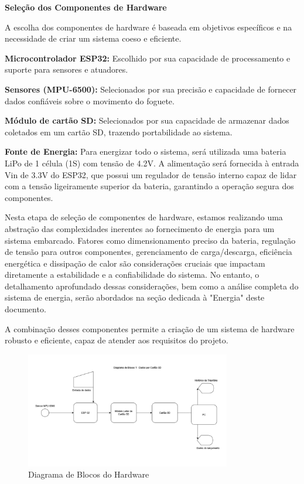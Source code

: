 \textbf{Seleção dos Componentes de Hardware}

A escolha dos componentes de hardware é baseada em objetivos específicos e na necessidade de criar um sistema coeso e eficiente.

\textbf{Microcontrolador ESP32:} Escolhido por sua capacidade de processamento e suporte para sensores e atuadores.

\textbf{Sensores (MPU-6500):} Selecionados por sua precisão e capacidade de fornecer dados confiáveis sobre o movimento do foguete.

\textbf{Módulo de cartão SD:} Selecionados por sua capacidade de armazenar dados coletados em um cartão SD, trazendo portabilidade ao sistema.

\textbf{Fonte de Energia:} Para energizar todo o sistema, será utilizada uma bateria LiPo de 1 célula (1S) com tensão de 4.2V. A alimentação será fornecida à entrada Vin de 3.3V do ESP32, que possui um regulador de tensão interno capaz de lidar com a tensão ligeiramente superior da bateria, garantindo a operação segura dos componentes.

Nesta etapa de seleção de componentes de hardware, estamos realizando uma abstração das complexidades inerentes ao fornecimento de energia para um sistema embarcado. Fatores como dimensionamento preciso da bateria, regulação de tensão para outros componentes, gerenciamento de carga/descarga, eficiência energética e dissipação de calor são considerações cruciais que impactam diretamente a estabilidade e a confiabilidade do sistema. No entanto, o detalhamento aprofundado dessas considerações, bem como a análise completa do sistema de energia, serão abordados na seção dedicada à "Energia" deste documento.

A combinação desses componentes permite a criação de um sistema de hardware robusto e eficiente, capaz de atender aos requisitos do projeto.


\begin{figure}[h!]
    \centering
    \includegraphics[width=0.8\textwidth]{figuras/diagramaDeBlocosHardware.png}

    \caption{Diagrama de Blocos do Hardware}
    \label{fig_diagrama_blocos_hardware}
\end{figure}

